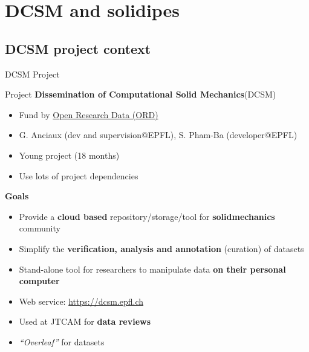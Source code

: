 \documentclass[10pt,compress,serif,aspectratio=169]{beamer}
\begin{document}


\section{DCSM and solidipes}
\subsection{DCSM project context}
\begin{frame}{DCSM Project}

Project \textbf{Dissemination of Computational Solid Mechanics}(DCSM)\\
\begin{itemize}
  \item Fund by \href{https://ethrat.ch/en/eth-domain/open-research-data/}{Open Research Data (ORD)}
  \item G. Anciaux (dev and supervision@EPFL), S. Pham-Ba (developer@EPFL)
  \item Young project (18 months)
  \item Use lots of project dependencies  
\end{itemize}
\vfill
\textbf{Goals}
\begin{itemize}
  \item Provide a \textbf{cloud based} repository/storage/tool for \textbf{solidmechanics} community
  \item Simplify the \textbf{verification, analysis and annotation} (curation) of datasets
  \item Stand-alone tool for researchers to manipulate data \textbf{on their personal computer}
  \item Web service: \url{https://dcsm.epfl.ch}
  \item Used at JTCAM for \textbf{data reviews}
  \item \textit{``Overleaf''} for datasets
\end{itemize}
\end{frame}
\end{document}
